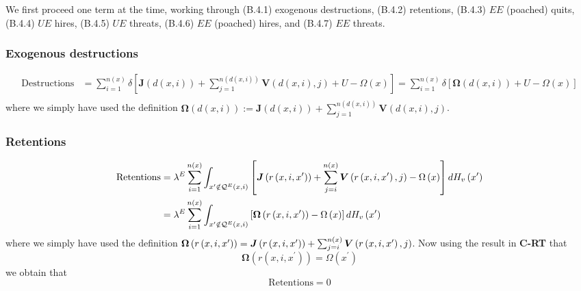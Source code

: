 We first proceed one term at the time, working
through (B.4.1) exogenous destructions, (B.4.2) retentions, (B.4.3) $EE$ (poached)
quits, (B.4.4) $UE $ hires, (B.4.5) $UE$ threats, (B.4.6) $EE$ (poached) hires, and (B.4.7) $%
EE$ threats.

\subsubsection{Exogenous destructions}

\begin{align*}
\text{Destructions}
& =\sum\limits _{i=1}^{n\left(x\right)}\delta\left[\boldsymbol{J}%
\left(d(x,i)\right)+\sum_{j=1}^{n\left(d(x,i)\right)}\boldsymbol{V}%
\left(d(x,i),j\right)+U-\Omega\left(x\right)\right] =\sum\limits _{i=1}^{n\left(x\right)}\delta\left[\boldsymbol{\Omega}%
\left(d(x,i)\right)+U-\Omega\left(x\right)\right] \\
\end{align*}
where we simply have used the definition $\boldsymbol{\Omega}\left(d(x,i)%
\right):=\boldsymbol{J}\left(d(x,i)\right)+\sum_{j=1}^{n\left(d(x,i)\right)}%
\boldsymbol{V}\left(d(x,i),j\right)$.

\subsubsection{Retentions}

\begin{align*}
\text{Retentions} & =\lambda^{E}\sum\limits
_{i=1}^{n\left(x\right)}\int_{x^{\prime}\notin\mathcal{Q}^E\left(x,i\right)}%
\left[\boldsymbol{J}\left(r\left(x,i,x^{\prime}\right)\right)+\sum_{j=i}^{n%
\left(x\right)}\boldsymbol{V}\left(r\left(x,i,x^{\prime}\right),j\right)-\Omega%
\left(x\right)\right]dH_v\left(x^{\prime}\right) \\
& =\lambda^{E}\sum\limits _{i=1}^{n\left(x\right)}\int_{x^{\prime}\notin%
\mathcal{Q}^E\left(x,i\right)}\left[\boldsymbol{\Omega}\left(r\left(x,i,x^{%
\prime}\right)\right)-\Omega\left(x\right)\right]dH_v\left(x^{\prime}\right)
\end{align*}
where we simply have used the definition $\boldsymbol{\Omega}\left(r%
\left(x,i,x^{\prime}\right)\right) =\boldsymbol{J}\left(r\left(x,i,x^{\prime}%
\right)\right)+\sum_{j=i}^{n\left(x\right)}\boldsymbol{V}\left(r\left(x,i,x^{%
\prime}\right),j\right)$. Now using the result in \textbf{C-RT} that
\begin{equation*}
\boldsymbol{\Omega}\left(r\left(x,i,x^{\prime}\right)\right) = \Omega(x^{\prime})
\end{equation*}
we obtain that
\begin{equation*}
\text{Retentions} = 0
\end{equation*}

